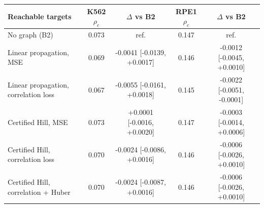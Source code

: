 \begin{tabular}{lcccc}
\toprule
Reachable targets & K562 $\rho_c$ & $\Delta$ vs B2 & RPE1 $\rho_c$ & $\Delta$ vs B2\\\midrule
No graph (B2) & 0.073 & ref. & 0.147 & ref.\\
Linear propagation, MSE & 0.069 & -0.0041 [-0.0139, +0.0017] & 0.146 & -0.0012 [-0.0045, +0.0010]\\
Linear propagation, correlation loss & 0.067 & -0.0055 [-0.0161, +0.0018] & 0.145 & -0.0022 [-0.0051, -0.0001]\\
Certified Hill, MSE & 0.073 & +0.0001 [-0.0016, +0.0020] & 0.147 & -0.0003 [-0.0014, +0.0006]\\
Certified Hill, correlation loss & 0.070 & -0.0024 [-0.0086, +0.0016] & 0.146 & -0.0006 [-0.0026, +0.0010]\\
Certified Hill, correlation + Huber & 0.070 & -0.0024 [-0.0087, +0.0016] & 0.146 & -0.0006 [-0.0026, +0.0010]\\
\bottomrule
\end{tabular}